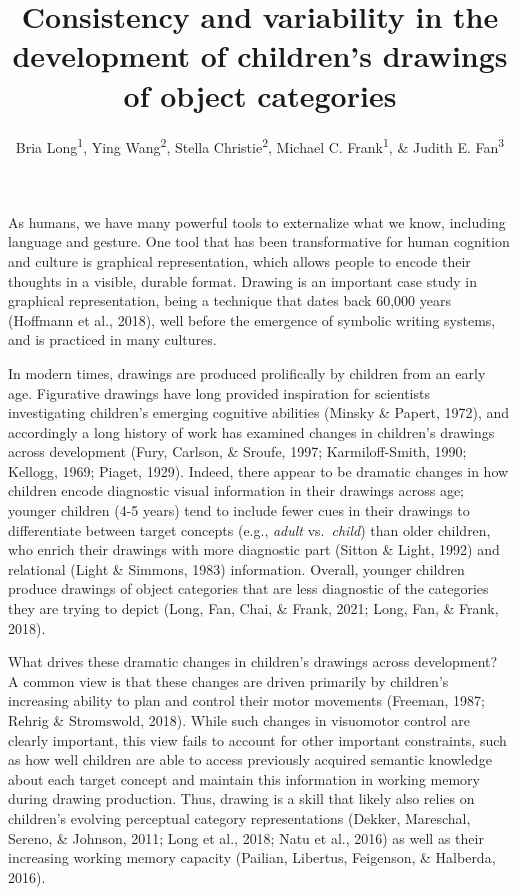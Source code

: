 \documentclass[
  english,
  man]{apa6}
\author{Bria Long\textsuperscript{1}, Ying Wang\textsuperscript{2}, Stella Christie\textsuperscript{2}, Michael C. Frank\textsuperscript{1}, \& Judith E. Fan\textsuperscript{3}}
\affiliation{
\vspace{0.5cm}
\textsuperscript{1} Stanford University\\\textsuperscript{2} Tsinghua University\\\textsuperscript{3} University of California, San Diego}
\title{Consistency and variability in the development of children's drawings of object categories}
\date{}
\begin{document}
\maketitle

As humans, we have many powerful tools to externalize what we know, including language and gesture.
One tool that has been transformative for human cognition and culture is graphical representation, which allows people to encode their thoughts in a visible, durable format.
Drawing is an important case study in graphical representation, being a technique that dates back 60,000 years (Hoffmann et al., 2018), well before the emergence of symbolic writing systems, and is practiced in many cultures.

In modern times, drawings are produced prolifically by children from an early age.
Figurative drawings have long provided inspiration for scientists investigating children's emerging cognitive abilities (Minsky \& Papert, 1972), and accordingly a long history of work has examined changes in children's drawings across development (Fury, Carlson, \& Sroufe, 1997; Karmiloff-Smith, 1990; Kellogg, 1969; Piaget, 1929).
Indeed, there appear to be dramatic changes in how children encode diagnostic visual information in their drawings across age; younger children (4-5 years) tend to include fewer cues in their drawings to differentiate between target concepts (e.g., \textit{adult} vs.~\textit{child}) than older children, who enrich their drawings with more diagnostic part (Sitton \& Light, 1992) and relational (Light \& Simmons, 1983) information.
Overall, younger children produce drawings of object categories that are less diagnostic of the categories they are trying to depict (Long, Fan, Chai, \& Frank, 2021; Long, Fan, \& Frank, 2018).

What drives these dramatic changes in children's drawings across development?
A common view is that these changes are driven primarily by children's increasing ability to plan and control their motor movements (Freeman, 1987; Rehrig \& Stromswold, 2018).
While such changes in visuomotor control are clearly important, this view fails to account for other important constraints, such as how well children are able to access previously acquired semantic knowledge about each target concept and maintain this information in working memory during drawing production.
Thus, drawing is a skill that likely also relies on children's evolving perceptual category representations (Dekker, Mareschal, Sereno, \& Johnson, 2011; Long et al., 2018; Natu et al., 2016) as well as their increasing working memory capacity (Pailian, Libertus, Feigenson, \& Halberda, 2016).
\end{document}
